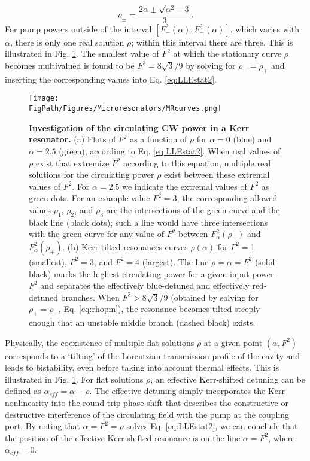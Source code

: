 \begin{equation}
\rho_\pm=\frac{2\alpha\pm\sqrt{\alpha^2-3}}{3}.\label{eq:rhopm}
\end{equation}
For pump powers outside of the interval $[F^2_-(\alpha),F^2_+(\alpha)]$, which varies with $\alpha$, there is only one real solution $\rho$; within this interval there are three. This is illustrated in Fig. \ref{fig:MRcurves}. The smallest value of $F^2$ at which the stationary curve $\rho$ becomes multivalued is found to be $F^2=8\sqrt{3}/9$ by solving for $\rho_-=\rho_+$ and inserting the corresponding values into Eq. \ref{eq:LLEstat2}.

\begin{figure}[htpb]
	\begin{center}
		\texttt{[image: \\FigPath/Figures/Microresonators/MRcurves.png]}
	\end{center}
	\caption[Investigation of the circulating CW power in a Kerr resonator]{\textbf{Investigation of the circulating CW power in a Kerr resonator.} (a) Plots of $F^2$ as a function of $\rho$ for $\alpha=0$ (blue) and $\alpha=2.5$ (green), according to Eq. \ref{eq:LLEstat2}. When real values of $\rho$ exist that extremize $F^2$ according to this equation, multiple real solutions for the circulating power $\rho$ exist between these extremal values of $F^2$. For $\alpha=2.5$ we indicate the extremal values of $F^2$ as green dots. For an example value $F^2=3$, the corresponding allowed values $\rho_1$, $\rho_2$, and $\rho_3$ are the intersections of the green curve and the black line (black dots); such a line would have three intersections with the green curve for any value of $F^2$ between $F^2_\alpha(\rho_-)$ and $F^2_\alpha(\rho_+)$. (b) Kerr-tilted resonances curves $\rho(\alpha)$ for $F^2=$1 (smallest), $F^2=$3, and $F^2=$4 (largest). The line $\rho=\alpha=F^2$ (solid black) marks the highest circulating power for a given input power $F^2$ and separates the effectively blue-detuned and effectively red-detuned branches. When $F^2>8\sqrt{3}/9$ (obtained by solving for $\rho_+=\rho_-$, Eq. \ref{eq:rhopm}), the resonance becomes tilted steeply enough that an unstable middle branch (dashed black) exists. }
	
	\label{fig:MRcurves}
\end{figure} 

Physically, the coexistence of multiple flat solutions $\rho$ at a given point $(\alpha,F^2)$ corresponds to a `tilting' of the Lorentzian transmission profile of the cavity and leads to bistability, even before taking into account thermal effects. This is illustrated in Fig. \ref{fig:MRcurves}. For flat solutions $\rho$, an effective Kerr-shifted detuning can be defined as $\alpha_{eff}=\alpha-\rho$. The effective detuning simply incorporates the Kerr nonlinearity into the round-trip phase shift that describes the constructive or destructive interference of the circulating field with the pump at the coupling port. By noting that $\alpha=F^2=\rho$ solves Eq. \ref{eq:LLEstat2}, we can conclude that the position of the effective Kerr-shifted resonance is on the line $\alpha=F^2$, where $\alpha_{eff}=0$. 

